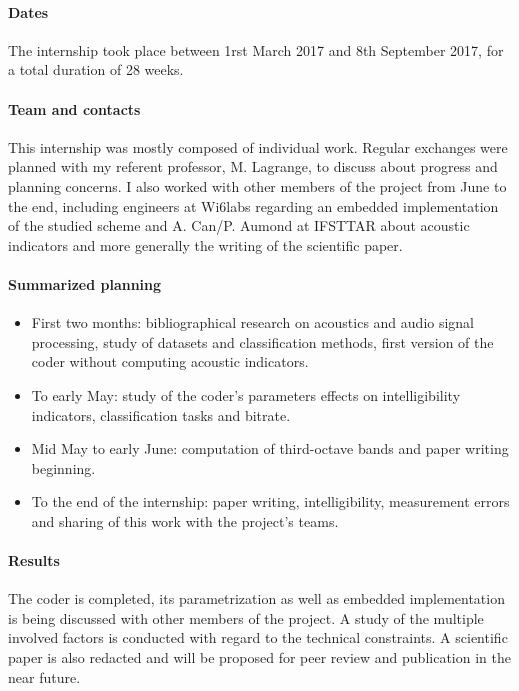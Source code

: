 \documentclass[12pt,times,onecolumn]{article}
\begin{document}
\paragraph{Dates\\}
The internship took place between 1rst March 2017 and 8th September 2017, for a total duration of 28 weeks.
\paragraph{Team and contacts\\}
This internship was mostly composed of individual work. Regular exchanges were planned with my referent professor, M. Lagrange, to discuss about progress and planning concerns. I also worked with other members of the project from June to the end, including engineers at Wi6labs regarding an embedded implementation of the studied scheme and A. Can/P. Aumond at IFSTTAR about acoustic indicators and more generally the writing of the scientific paper.
\paragraph{Summarized planning\\}
\begin{itemize}
\item First two months: bibliographical research on acoustics and audio signal processing, study of datasets and classification methods, first version of the coder without computing acoustic indicators.
\item To early May: study of the coder's parameters effects on intelligibility indicators, classification tasks and bitrate.
\item Mid May to early June: computation of third-octave bands and paper writing beginning.
\item To the end of the internship: paper writing, intelligibility, measurement errors and sharing of this work with the project's teams.
\end{itemize}

\paragraph{Results\\}
The coder is completed, its parametrization as well as embedded implementation is being discussed with other members of the project. A study of the multiple involved factors is conducted with regard to the technical constraints. A scientific paper is also redacted and will be proposed for peer review and publication in the near future.
\end{document}
